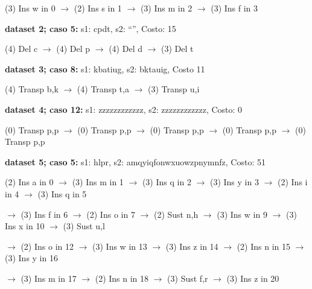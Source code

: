 (3) Ins w in 0 $\rightarrow$ (2) Ins s in 1 $\rightarrow$ (3) Ins m in 2 $\rightarrow$ (3) Ins f in 3

\textbf{dataset 2; caso 5:} s1: cpdt, s2: ``'', Costo: 15

(4) Del c $\rightarrow$ (4) Del p $\rightarrow$ (4) Del d $\rightarrow$ (3) Del t 

\textbf{dataset 3; caso 8:} s1: kbatiug, s2: bktauig, Costo 11

(4) Transp b,k $\rightarrow$ (4) Transp t,a $\rightarrow$ (3) Transp u,i

\textbf{dataset 4; caso 12:} s1: zzzzzzzzzzzz, s2: zzzzzzzzzzzz, Costo: 0

(0) Transp p,p $\rightarrow$ (0) Transp p,p $\rightarrow$ (0) Transp p,p $\rightarrow$ (0) Transp p,p $\rightarrow$ (0) Transp p,p

\textbf{dataset 5; caso 5:} s1: hlpr, s2: amqyiqfonwxuowzpnymnfz, Costo: 51

(2) Ins a in 0 $\rightarrow$ (3) Ins m in 1 $\rightarrow$ (3) Ins q in 2 $\rightarrow$ (3) Ins y in 3 $\rightarrow$ (2) Ins i in 4 $\rightarrow$ (3) Ins q in 5 

$\rightarrow$ (3) Ins f in 6 $\rightarrow$ (2) Ins o in 7 $\rightarrow$ 
(2) Sust n,h $\rightarrow$ (3) Ins w in 9 $\rightarrow$ (3) Ins x in 10 $\rightarrow$ (3) Sust u,l 

$\rightarrow$ (2) Ins o in 12 $\rightarrow$ (3) Ins w in 13 $\rightarrow$ (3) Ins z in 14 $\rightarrow$ (2) Ins n in 15 $\rightarrow$ (3) Ins y in 16 

$\rightarrow$ (3) Ins m in 17 $\rightarrow$ (2) Ins n in 18 $\rightarrow$ (3) Sust f,r $\rightarrow$ (3) Ins z in 20  
